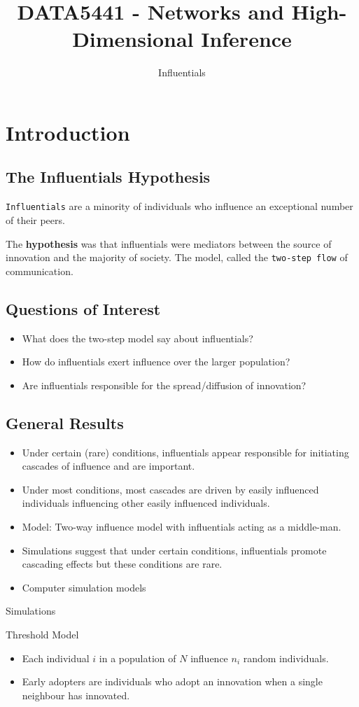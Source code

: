 \documentclass[10pt, oneside, reqno]{amsart}
\title{DATA5441 - Networks and High-Dimensional Inference}                                %
\author{Influentials}
\date{}                                           %
\theoremstyle{plain}%
\theoremstyle{definition}
\theoremstyle{remark}
\begin{document}
\maketitle \tableofcontents \clearpage

\section{Introduction}

\subsection{The Influentials Hypothesis}
\texttt{Influentials} are a minority of individuals who influence an exceptional 
number of their peers. 

The \textbf{hypothesis} was that influentials were mediators between the source of innovation and the majority 
of society. The model, called the \texttt{two-step flow} of communication.

\subsection{Questions of Interest}
\begin{itemize}
    \item What does the two-step model say about influentials?
    \item How do influentials exert influence over the larger population?
    \item Are influentials responsible for the spread/diffusion of innovation?
\end{itemize}


\subsection{General Results}

\begin{itemize}
    \item Under certain (rare) conditions, influentials appear responsible for 
    initiating cascades of influence and are important.
    \item Under most conditions, most cascades are driven by easily influenced individuals
    influencing other easily influenced individuals.
\end{itemize}


\begin{itemize}
    \item Model: Two-way influence model with influentials acting as a middle-man.
    \item Simulations suggest that under certain conditions, influentials promote 
    cascading effects but these conditions are rare.
    \item Computer simulation models 
\end{itemize}


Simulations 

Threshold Model
\begin{itemize}
    \item Each individual $i$ in a population of $N$ influence $n_i$ random individuals.
    \item Early adopters are individuals who adopt an innovation when a single neighbour has innovated.
\end{itemize}
\end{document}
